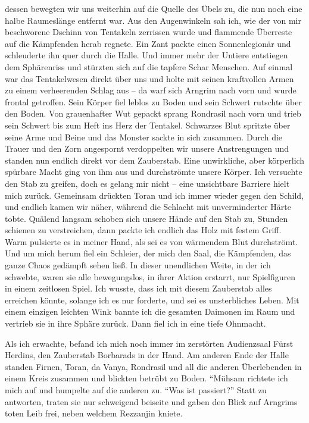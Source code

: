 dessen bewegten wir uns weiterhin auf die Quelle des Übels zu, die nun noch eine halbe Raumeslänge entfernt war. Aus den Augenwinkeln sah ich, wie der von mir beschworene Dschinn von Tentakeln zerrissen wurde und flammende Überreste auf die Kämpfenden herab regnete. Ein Zant packte einen Sonnenlegionär und schleuderte ihn quer durch die Halle. Und immer mehr der Untiere entstiegen dem Sphärenriss und stürzten sich auf die tapfere Schar Menschen. Auf einmal war das Tentakelwesen direkt über uns und holte mit seinen kraftvollen Armen zu einem verheerenden Schlag aus -- da warf sich Arngrim nach vorn und wurde frontal getroffen. Sein Körper fiel leblos zu Boden und sein Schwert rutschte über den Boden. Von grauenhafter Wut gepackt sprang Rondrasil nach vorn und trieb sein Schwert bis zum Heft ins Herz der Tentakel. Schwarzes Blut spritzte über seine Arme und Beine und das Monster sackte in sich zusammen. Durch die Trauer und den Zorn angespornt verdoppelten wir unsere Anstrengungen und standen nun endlich direkt vor dem Zauberstab. Eine unwirkliche, aber körperlich spürbare Macht ging von ihm aus und durchströmte unsere Körper. Ich versuchte den Stab zu greifen, doch es gelang mir nicht -- eine unsichtbare Barriere hielt mich zurück. Gemeinsam drückten Toran und ich immer wieder gegen den Schild, und endlich kamen wir näher, während die Schlacht mit unverminderter Härte tobte. Quälend langsam schoben sich unsere Hände auf den Stab zu, Stunden schienen zu verstreichen, dann packte ich endlich das Holz mit festem Griff. Warm pulsierte es in meiner Hand, als sei es von wärmendem Blut durchströmt. Und um mich herum fiel ein Schleier, der mich den Saal, die Kämpfenden, das ganze Chaos gedämpft sehen ließ. In dieser unendlichen Weite, in der ich schwebte, waren sie alle bewegungslos, in ihrer Aktion erstarrt, nur Spielfiguren in einem zeitlosen Spiel. Ich wusste, dass ich mit diesem Zauberstab alles erreichen könnte, solange ich es nur forderte, und sei es unsterbliches Leben. Mit einem einzigen leichten Wink bannte ich die gesamten Daimonen im Raum und vertrieb sie in ihre Sphäre zurück. Dann fiel ich in eine tiefe Ohnmacht.

Als ich erwachte, befand ich mich noch immer im zerstörten Audienzsaal Fürst Herdins, den Zauberstab Borbarads in der Hand. Am anderen Ende der Halle standen Firnen, Toran, da Vanya, Rondrasil und all die anderen Überlebenden in einem Kreis zusammen und blickten betrübt zu Boden. ``Mühsam richtete ich mich auf und humpelte auf die anderen zu. ``Was ist passiert?'' Statt zu antworten, traten sie nur schweigend beiseite und gaben den Blick auf Arngrims toten Leib frei, neben welchem Rezzanjin kniete.

